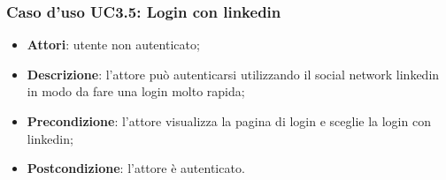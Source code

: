 \subsubsection{Caso d'uso UC3.5: Login con linkedin}
\begin{itemize}
	\item \textbf{Attori}: utente non autenticato;
	\item \textbf{Descrizione}: l'attore può autenticarsi utilizzando il social network linkedin in modo da fare una login molto rapida;
	\item \textbf{Precondizione}: l'attore visualizza la pagina di login e sceglie la login con linkedin;
	\item \textbf{Postcondizione}: l'attore è autenticato.
\end{itemize}